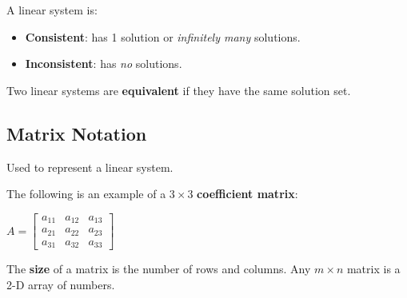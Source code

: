 \documentclass[12pt, letterpaper]{article}
\begin{document}
A linear system is:

\begin{itemize}
  \item \textbf{Consistent}: has 1 solution or \textit{infinitely
    many} solutions.
  \item \textbf{Inconsistent}: has \textit{no} solutions.
\end{itemize}

Two linear systems are \textbf{equivalent} if they have the same solution set.
\medskip

\subsection*{Matrix Notation}

Used to represent a linear system.
\medskip

The following is an example of a $ 3 \times 3 $ \textbf{coefficient matrix}:

\medskip
{\centering

  $ A =
  \begin{bmatrix}
    a_{11} & a_{12} & a_{13} \\
    a_{21} & a_{22} & a_{23} \\
    a_{31} & a_{32} & a_{33}
  \end{bmatrix}  $

}
\medskip

The \textbf{size} of a matrix is the number of rows and columns. Any
$ m \times n $ matrix is a 2-D array of numbers.
\end{document}
